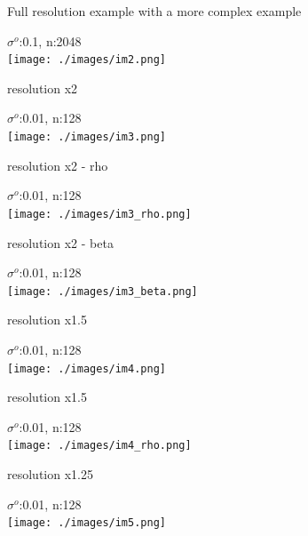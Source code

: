 \documentclass[francais]{beamer}
\begin{document}
\begin{frame}{Full resolution example with a more complex example}
\begin{center}
$\sigma^o$:0.1, n:2048\\
 \texttt{[image: ./images/im2.png]}
\end{center}
\end{frame}


\begin{frame}{resolution x2}
\begin{center}
$\sigma^o$:0.01, n:128\\
 \texttt{[image: ./images/im3.png]}
\end{center}
\end{frame}


\begin{frame}{resolution x2 - rho}
\begin{center}
$\sigma^o$:0.01, n:128\\
 \texttt{[image: ./images/im3\_rho.png]}
\end{center}
\end{frame}


\begin{frame}{resolution x2 - beta}
\begin{center}
$\sigma^o$:0.01, n:128\\
 \texttt{[image: ./images/im3\_beta.png]}
\end{center}
\end{frame}







\begin{frame}{resolution x1.5}
\begin{center}
$\sigma^o$:0.01, n:128\\
 \texttt{[image: ./images/im4.png]}
\end{center}
\end{frame}


\begin{frame}{resolution x1.5}
\begin{center}
$\sigma^o$:0.01, n:128\\
 \texttt{[image: ./images/im4\_rho.png]}
\end{center}
\end{frame}





\begin{frame}{resolution x1.25}
\begin{center}
$\sigma^o$:0.01, n:128\\
 \texttt{[image: ./images/im5.png]}
\end{center}
\end{frame}
\end{document}
